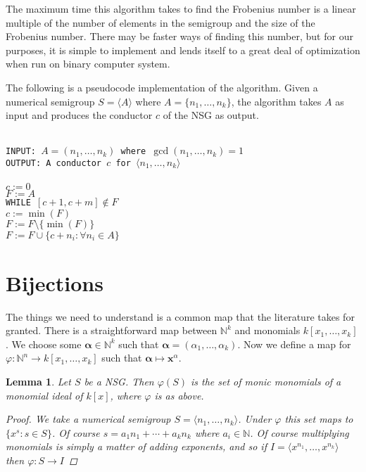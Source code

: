 \documentclass[11pt]{amsart}
\theoremstyle{plain}
\newtheorem{lemma}{Lemma}
\theoremstyle{definition}
\begin{document}
The maximum time this algorithm takes to find the Frobenius number is a linear
multiple of the number of elements in the semigroup and the size of the
Frobenius number. There may be faster ways of finding this number, but for our
purposes, it is simple to implement and lends itself to a great deal of optimization when run on binary computer system.\cite{frobmask}

The following is a pseudocode implementation of the algorithm. Given a numerical semigroup $S=\langle A\rangle$ where $A=\{n_1,\dots,n_k\}$, the algorithm takes $A$ as input and produces the conductor $c$ of the NSG as output.

\texttt{
\noindent
\\INPUT: $A=(n_1,\dots,n_k)$ where $\gcd(n_1,\dots,n_k)=1$\\
OUTPUT: A conductor $c$ for $\langle n_1,\dots,n_k\rangle$ \\
\\
\hspace*{1em}$c:=0$ \\
\hspace*{1em}$F:=A$ \\
\hspace*{1em}WHILE $[c+1,c+m]\not\in F$ \\
\hspace*{2em}$c:=\min(F)$\\
\hspace*{2em}$F:=F\setminus\{\min(F)\}$\\
\hspace*{2em}$F:=F\cup\{c+n_i:\forall n_i\in A\}$
\hspace*{2em}
\hspace*{2em}
}
\section{Bijections}
The things we need to understand is a common map that the literature takes for
granted. There is a straightforward map between $\mathbb{N}^k$ and monomials
$k[x_1,\dots,x_k]$. We choose some $\mathbf{\alpha}\in \mathbb{N}^k$ such that
$\mathbf{\alpha}=(\alpha_1,\dots,\alpha_k)$. Now we define a map for
$\varphi:\mathbb{N}^n\to k[x_1,\dots,x_k]$ such that $\mathbf{\alpha}\mapsto
\mathbf{x}^\alpha$.

\begin{lemma}
Let $S$ be a NSG.  Then $\varphi(S)$ is the set of monic
monomials of a monomial ideal of $k[x]$, where $\varphi$ is as above.
\begin{proof}
  We take a numerical semigroup $S=\langle n_1,\dots,n_k\rangle$. Under
$\varphi$ this set maps to $\{x^{s}:s\in S\}$. Of course $s=a_1n_1+\cdots+a_kn_k$
where $a_i\in \mathbb{N}$. Of course multiplying monomials is simply a matter
of adding exponents, and so if $I=\langle x^{n_1},\dots,x^{n_k}\rangle$ then
$\varphi:S\to I$
\end{proof}
\end{lemma}
\end{document}
